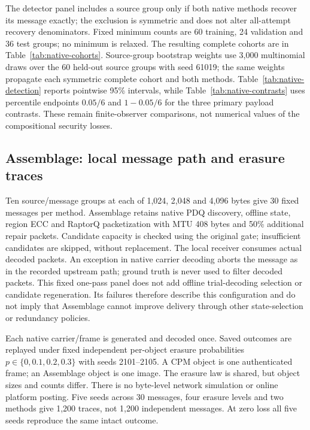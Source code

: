 \documentclass[journal]{IEEEtran}
\theoremstyle{definition}
\theoremstyle{game}
\begin{document}
The detector panel includes a source group only if both native methods
recover its message exactly; the exclusion is symmetric and does not
alter all-attempt recovery denominators. Fixed minimum counts are
60 training, 24 validation and 36 test groups; no minimum is relaxed.
The resulting complete cohorts are in
Table~\ref{tab:native-cohorts}. Source-group bootstrap weights use
3,000 multinomial draws over the 60 held-out source groups with seed
61019; the same weights propagate each symmetric complete cohort and
both methods. Table~\ref{tab:native-detection} reports pointwise 95\%
intervals, while Table~\ref{tab:native-contrasts} uses percentile
endpoints $0.05/6$ and $1-0.05/6$ for the three primary payload
contrasts. These remain finite-observer comparisons, not numerical
values of the compositional security losses.

\subsection{Assemblage: local message path and erasure traces}
\label{subsec:native-assemblage-method}
Ten source/message groups at each of 1,024, 2,048 and 4,096 bytes
give 30 fixed messages per method. Assemblage retains native PDQ
discovery, offline state, region ECC and RaptorQ packetization with
MTU 408 bytes and 50\% additional repair packets. Candidate capacity
is checked using the original gate; insufficient candidates are
skipped, without replacement. The local receiver consumes actual
decoded packets. An exception in native carrier decoding aborts the
message as in the recorded upstream path; ground truth is never used
to filter decoded packets. This fixed one-pass panel does not add
offline trial-decoding selection or candidate regeneration.
Its failures therefore describe this configuration and do not imply
that Assemblage cannot improve delivery through other state-selection
or redundancy policies.

Each native carrier/frame is generated and decoded once. Saved
outcomes are replayed under fixed independent per-object erasure
probabilities $p\in\{0,0.1,0.2,0.3\}$ with seeds
2101--2105. A CPM object is one authenticated frame; an Assemblage
object is one image. The erasure law is shared, but object sizes and
counts differ. There is no byte-level network simulation or online
platform posting. Five seeds across 30 messages, four erasure levels
and two methods give 1,200 traces, not 1,200 independent messages.
At zero loss all five seeds reproduce the same intact outcome.
\end{document}
